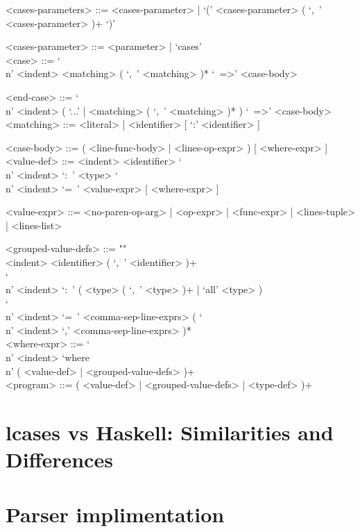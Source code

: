 \documentclass{article}
\begin{document}
\begin{grammar}
<cases-parameters> ::=
<cases-parameter> | `(' <cases-parameter> ( `,\ ' <cases-parameter> )+ `)'

<cases-parameter> ::= <parameter> | `cases' \\

<case> ::=  `\\n' <indent> <matching> ( `,\ ' <matching> )* `\ =>' <case-body>

<end-case> ::=
`\\n' <indent> ( `...' | <matching> ( `,\ ' <matching> )* ) `\ =>' <case-body>\\

<matching> ::= <literal> | <identifier> [ `:' <identifier> ]

<case-body> ::=
( <line-func-body> | <lines-op-expr> ) [ <where-expr> ]\\

<value-def> ::= 
<indent> <identifier> 
`\\n' <indent> `:\ ' <type> 
`\\n' <indent> `=\ ' <value-expr> [ <where-expr> ]

<value-expr> ::=
<no-paren-op-arg> | <op-expr> | <func-expr> | <lines-tuple> | <lines-list>

<grouped-value-defs> ::= ""\\
<indent> <identifier> ( `,\ ' <identifier> )+ \\
`\\n' <indent> `:\ ' ( <type> ( `,\ ' <type> )+ | `all' <type> ) \\
`\\n' <indent> `=\ '
<comma-sep-line-exprs> ( `\\n' <indent> `,' <comma-sep-line-exprs> )* \\

<where-expr> ::=
`\\n' <indent> `where\\n' ( <value-def> | <grouped-value-defs> )+ \\

<program> ::= ( <value-def> | <grouped-value-defs> | <type-def> )+

\end{grammar}

\section{lcases vs Haskell: Similarities and Differences}

\section{Parser implimentation}
\end{document}
